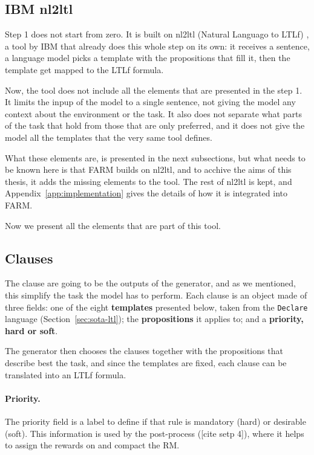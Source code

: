 \documentclass[11pt,english,listoffigures,listoftables]{tfgetsinf}
\begin{document}
\subsection{IBM nl2ltl}
Step 1 does not start from zero. It is built on nl2ltl (Natural Languago to LTLf) \cite{fuggitti2023nl2ltl}, a tool by IBM that already does this whole step on its own: it receives a sentence, a language model picks a template with the propositions that fill it, then the template get mapped to the LTLf formula. 

Now, the tool does not include all the elements that are presented in the step 1. It limits the inpup of the model to a single sentence, not giving the model any context about the environment or the task. It also does not separate what parts of the task that hold from those that are only preferred, and it does not give the model all the templates that the very same tool defines.

What these elements are, is presented in the next subsections, but what needs to be known here is that FARM builds on nl2ltl, and to acchive the aims of this thesis, it adds the missing elements to the tool. The rest of nl2ltl is kept, and Appendix~\ref{app:implementation} gives the details of how it is integrated into FARM.

Now we present all the elements that are part of this tool.

\subsection{Clauses} 
The clause are going to be the outputs of the generator, and as we mentioned, this simplify the task the model has to perform. Each clause is an object made of three fields: one of the eight \textbf{templates} presented below, taken from the \texttt{Declare} language (Section~\ref{sec:sota-ltl}); the \textbf{propositions} it applies to; and a \textbf{priority, hard or soft}. 

The generator then chooses the clauses together with the propositions that describe best the task, and since the templates are fixed, each clause can be translated into an LTLf formula. 

\paragraph{Priority.} The priority field is a label to define if that rule is mandatory (hard) or desirable (soft). This information is used by the post-process ([cite setp 4]), where it helps to assign the rewards on and compact the RM. 
\end{document}
